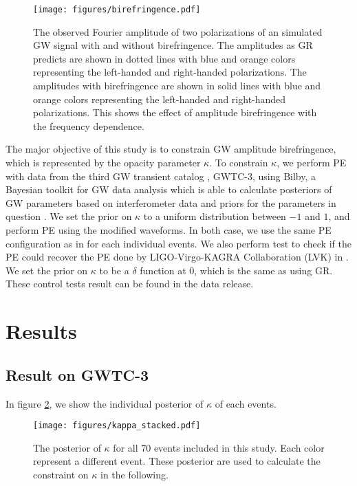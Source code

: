 \documentclass[reprint,amsmath,amssymb,aps,twocolumn]{aastex631}
\begin{document}
\begin{figure}[h]
    \texttt{[image: figures/birefringence.pdf]}
    \caption{
        The observed Fourier amplitude of two polarizations of an simulated GW signal with and without birefringence.
        The amplitudes as GR predicts are shown in dotted lines with blue and orange colors representing the left-handed and right-handed polarizations.
        The amplitudes with birefringence are shown in solid lines with blue and orange colors representing the left-handed and right-handed polarizations.
        This shows the effect of amplitude birefringence with the frequency dependence.
    }
    \label{fig:birefringence}
\end{figure}

The major objective of this study is to constrain GW amplitude birefringence, which is represented by the opacity parameter $\kappa$.
To constrain $\kappa$, we perform PE with data from the third GW transient catalog \citep{GWTC-2.1, GWTC-3}, GWTC-3, using Bilby, a Bayesian toolkit for GW data analysis which is able to calculate posteriors of GW parameters based on interferometer data and priors for the parameters in question \citep{Bilby}. 
We set the prior on $\kappa$ to a uniform distribution between $-1$ and $1$, and perform PE using the modified waveforms.
In both case, we use the same PE configuration as in \citet{GWTC-2.1, GWTC-3} for each individual events.
We also perform test to check if the PE could recover the PE done by LIGO-Virgo-KAGRA Collaboration (LVK) in \citet{GWTC-2.1, GWTC-3}.
We set the prior on $\kappa$ to be a $\delta$ function at $0$, which is the same as using GR.
These control tests result can be found in the data release.

\section{Results}
\label{sec:Results}

\subsection{Result on GWTC-3}
In figure \ref{fig:kappa_stacked}, we show the individual posterior of $\kappa$ of each events.

\begin{figure}[h]
    \texttt{[image: figures/kappa\_stacked.pdf]}
    \caption{
        The posterior of $\kappa$ for all 70 events included in this study.
        Each color represent a different event.
        These posterior are used to calculate the constraint on $\kappa$ in the following.
    }
    \label{fig:kappa_stacked}
\end{figure}
\end{document}
